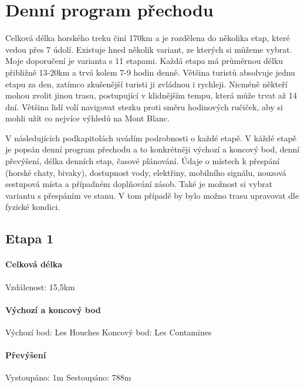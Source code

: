 \chapter{Denní program přechodu}
\label{Program_prechodu}
\def\figurename{Obr.} %
\def\tablename{Tab.} %
\def\figureautorefname{obr.} %
\def\tableautorefname{tab.} %
\def\chapterautorefname{kapitola} %

Celková délka horského treku činí 170\:km a je rozdělena do několika etap, které vedou přes 7 údolí. Existuje hned několik variant, ze kterých si můžeme vybrat.
Moje doporučení je varianta s 11 etapami. Každá etapa má průměrnou délku přibližně 13-20\:km a trvá kolem 7-9 hodin denně. Většina turistů absolvuje jednu etapu za den, zatímco zkušenější turisti ji zvládnou i rychleji. Nicméně někteří mohou zvolit jinou trasu, postupující v klidnějším tempu, která může trvat až 14 dní. Většina lidí volí navigovat stezku proti směru hodinových ručiček, aby si mohli užít co nejvíce výhledů na Mont Blanc. 

V následujících podkapitolách uvádím podrobnosti o každé etapě. V káždé etapě je popsán denní program přechodu a to konkrétněji výchozí a koncový bod, denní převýšení, délka denních etap, časové plánování. Údaje o místech k přespání (horské chaty, bivaky), dostupnost vody, elektřiny, mobilního signálu, nouzová sestupová místa a případném doplňování zásob. Také je možnost si vybrat variantu s přespáním ve stanu. V tom případě by bylo možno trasu upravovat dle fyzické kondici.
\section{Etapa 1}
\subsubsection*{Celková délka}
\noindent Vzdálenost: 15,5\:km
\subsubsection*{Výchozí a koncový bod}
\noindent Výchozí bod: Les Houches
\noindent Koncový bod: Les Contamines
\subsubsection*{Převýšení}
\noindent Vystoupáno: 1\:m
\noindent Sestoupáno: 788\:m
